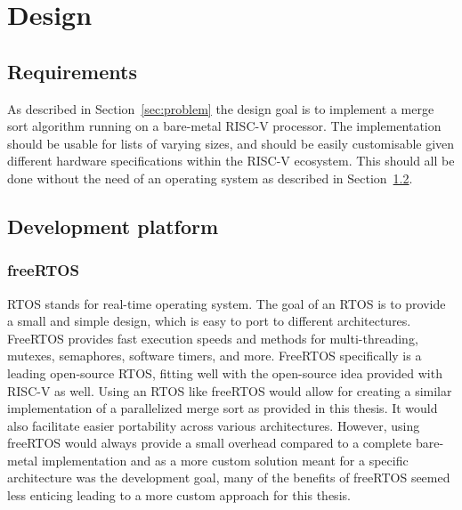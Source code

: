 \section{Design}\label{sec:Design}
\subsection{Requirements}
As described in Section~\ref{sec:problem} the design goal is to implement
a merge sort algorithm running on a bare-metal RISC-V processor. The
implementation should be usable for lists of varying sizes, and should be easily
customisable given different hardware specifications within the RISC-V
ecosystem. This should all be done without the need of an operating system as
described in Section~\ref{sec:bare-metal}.

\subsection{Development platform}\label{sec:bare-metal}
\subsubsection*{freeRTOS}
RTOS stands for real-time operating system. The goal of an RTOS is to provide a
small and simple design, which is easy to port to different architectures.
FreeRTOS provides fast execution speeds and methods for
multi-threading, mutexes, semaphores, software timers, and more. FreeRTOS
specifically is a leading open-source RTOS, fitting well with the open-source
idea provided with RISC-V as well. Using an RTOS like freeRTOS would allow for
creating a similar implementation of a parallelized merge sort as provided in
this thesis. It would also facilitate easier portability across various
architectures. However, using freeRTOS would always provide a small overhead
compared to a complete bare-metal implementation and as a more custom solution
meant for a specific architecture was the development goal, many of the benefits
of freeRTOS seemed less enticing leading to a more custom approach for this
thesis.

